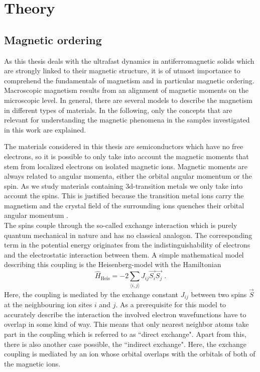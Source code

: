 \chapter{Theory}

\section{Magnetic ordering}
\label{sec:magnetic_ordering}
As this thesis deals with the ultrafast dynamics in antiferromagnetic solids which are strongly linked to their magnetic structure, it is of utmost importance to comprehend the fundamentals of magnetism and in particular magnetic ordering.
Macroscopic magnetism results from an alignment of magnetic moments on the microscopic level.
In general, there are several models to describe the magnetism in different types of materials.
In the following, only the concepts that are relevant for understanding the magnetic phenomena in the samples investigated in this work are explained.

The materials considered in this thesis are semiconductors which have no free electrons, so it is possible to only take into account the magnetic moments that stem from localized electrons on isolated magnetic ions.
Magnetic moments are always related to angular momenta, either the orbital angular momentum or the spin.
As we study materials containing 3d-transition metals we only take into account the spins.
This is justified because the transition metal ions carry the magnetism and the crystal field of the surrounding ions quenches their orbital angular momentum . \\
The spins couple through the so-called exchange interaction which is purely quantum mechanical in nature and has no classical analogon.
The corresponding term in the potential energy originates from the indistinguishability of electrons and the electrostatic interaction between them.
A simple mathematical model describing this coupling is the Heisenberg-model  with the Hamiltonian
\begin{equation}
    \hat{H}_{\text{Heis}} = -2 \sum_{\langle i,j \rangle} J_{ij} \vec{S_i} \vec{S_j} \;.
\end{equation}
Here, the coupling is mediated by the exchange constant $J_{ij}$ between two spins $\vec{S}$ at the neighbouring ion sites $i$ and $j$.
As a prerequisite for this model to accurately describe the interaction the involved electron wavefunctions have to overlap in some kind of way.
This means that only nearest neighbor atoms take part in the coupling which is referred to as ``direct exchange".
Apart from this, there is also another case possible, the ``indirect exchange".
Here, the exchange coupling is mediated by an ion whose orbital overlaps with the orbitals of both of the magnetic ions.

